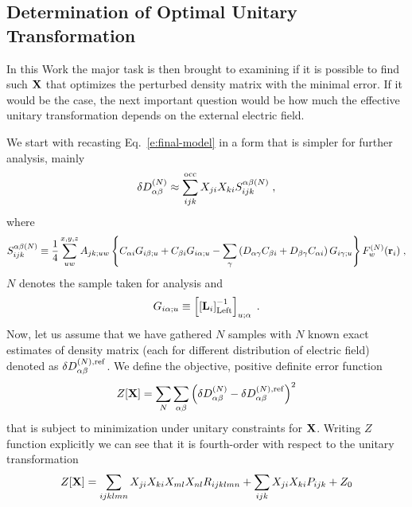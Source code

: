 \documentclass[aip,graphicx]{revtex4-1}
\begin{document}

\subsection{Determination of Optimal Unitary Transformation}

In this Work the major task is then brought to examining if it is possible to find such ${\bf X}$ that optimizes
the perturbed density matrix with the minimal error. If it would be the case, the next important question
would be how much the effective unitary transformation depends on the external electric field.

We start with recasting Eq.~\eqref{e:final-model} in a form that is simpler for further analysis, mainly
%
\begin{equation}
 \delta D_{\alpha\beta}^{(N)} \approx
  \sum_{ijk}^{\rm occ} X_{ji} X_{ki} S_{ijk}^{\alpha\beta(N)}  \;,
\end{equation}
%
where 
%
\begin{equation}
  S_{ijk}^{\alpha\beta(N)} \equiv 
   \frac{1}{4} \sum_{uw}^{x,y,z} A_{jk;uw} 
   \left\{
     C_{\alpha i} G_{i\beta ;u} + C_{\beta i} G_{i\alpha ;u} 
   - \sum_\gamma \left(
        D_{\alpha\gamma} C_{\beta i} + D_{\beta\gamma} C_{\alpha i} 
    \right) G_{i\gamma ;u}
   \right\}
   F_w^{(N)}({\bf r}_i)  \;,
\end{equation}
%
$N$ denotes the sample taken for analysis and
%
\begin{equation}
 G_{i\alpha ;u} \equiv  \left[ \left[ {\bf L}_i  \right]^{-1}_{\rm Left} \right]_{u;\alpha}  \;.
\end{equation}
%
Now, let us assume that we have gathered $N$ samples with $N$ known exact estimates
of density matrix (each for different distribution of electric field) denoted as $\delta D_{\alpha\beta}^{(N),{\rm ref}}$. 
We define the objective, positive definite
error function
%
\begin{equation} \label{e:Z-func}
 Z[{\bf X}] = \sum_N \sum_{\alpha\beta} 
    \left( 
      \delta D_{\alpha\beta}^{(N)} - \delta D_{\alpha\beta}^{(N),{\rm ref}}
    \right)^2
\end{equation}
%
that is subject to minimization under unitary constraints for $\bf X$.
Writing $Z$ function explicitly we can see that it is fourth\hyp{}order with respect to
the unitary transformation
%
\begin{equation} \label{e:Z-func-explicit}
 Z[{\bf X}] = \sum_{ijklmn} X_{ji} X_{ki} X_{ml} X_{nl} R_{ijklmn}
    + \sum_{ijk} X_{ji} X_{ki} P_{ijk} 
    + Z_0
\end{equation}
\end{document}
